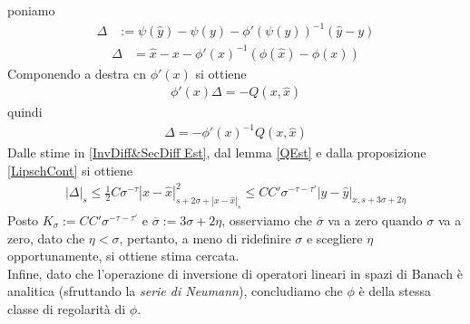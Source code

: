 \documentclass[twoside, 11pt]{amsbook}
\makeatletter
\newcommand{\0}{{(0)}}
\newcommand{\3}{{(3)}}
\theoremstyle{colonplain}
\theoremstyle{colondefinition}
\theoremstyle{colonremark}
\numberwithin{equation}{chapter}
\renewcommand{\proofname}{Dimostrazione}
\renewenvironment{proof}[1][\proofname]{\par
  \pushQED{\qed}%
  \normalfont \topsep6\p@\@plus6\p@\relax
  \trivlist
  \item[\hskip\labelsep\bfseries #1:]\ignorespaces
}{%
  \popQED\endtrivlist\@endpefalse
}
\makeatother
\begin{document}
\begin{proof} poniamo
\begin{align}
    \Delta &:= \psi(\hat{y}) - \psi(y) - \phi'(\psi(y))^{-1}(\hat{y} - y)
\end{align}
\begin{align}
    \Delta &= \hat{x} - x - \phi'(x)^{-1}(\phi(\hat{x}) - \phi(x))
\end{align}
Componendo a destra cn $\phi'(x)$ si ottiene
\begin{align}
    \phi'(x)\Delta = -Q(x, \hat{x})
\end{align}
quindi
\begin{align}
    \Delta = -\phi'(x)^{-1}Q(x, \hat{x})
\end{align}
Dalle stime in \eqref{InvDiff&SecDiff Est}, dal lemma \ref{QEst} e dalla proposizione \eqref{LipschCont} si ottiene
\begin{align}
    |\Delta|_s \leq \frac{1}{2}C\sigma^{-\tau}|x - \hat{x}|^2_{s + 2\sigma + |x - \hat{x}|_s} \leq CC'\sigma^{-\tau - \tau'}|y - \hat{y}|_{x, s + 3\sigma + 2\eta}
\end{align}
Posto $K_\sigma := CC'\sigma^{-\tau - \tau'}$ e $\overline{\sigma} := 3\sigma + 2\eta$, osserviamo che $\overline{\sigma}$ va a zero quando $\sigma$ va a zero, dato che $\eta < \sigma$, pertanto, a meno di ridefinire $\sigma$ e scegliere $\eta$ opportunamente, si ottiene stima cercata. \\
Infine, dato che l'operazione di inversione di operatori lineari in spazi di Banach è analitica (sfruttando la \textit{serie di Neumann}), concludiamo che $\phi$ è della stessa classe di regolarità di $\phi$. \end{proof}

\backmatter
\let\appendixname\empty
\def\chaptername{\bibname}



\end{document}
